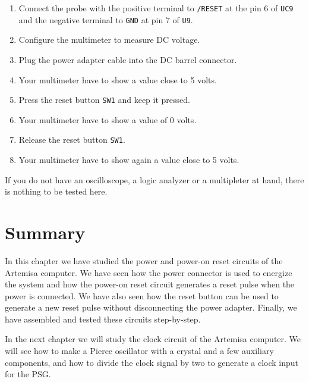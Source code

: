 \begin{enumerate}
  \item Connect the probe with the positive terminal to {\tt /RESET} at the pin 6 of {\tt UC9} and the negative terminal to {\tt GND} at pin 7 of {\tt U9}.
  \item Configure the multimeter to measure DC voltage.
  \item Plug the power adapter cable into the DC barrel connector.
  \item Your multimeter have to show a value close to 5 volts.
  \item Press the reset button {\tt SW1} and keep it pressed.
  \item Your multimeter have to show a value of 0 volts.
  \item Release the reset button {\tt SW1}.
  \item Your multimeter have to show again a value close to 5 volts.
\end{enumerate}

If you do not have an oscilloscope, a logic analyzer or a multipleter at hand, there is nothing to be tested here.

\section{Summary}

In this chapter we have studied the power and power-on reset circuits of the Artemisa computer. We
have seen how the power connector is used to energize the system and how the power-on reset circuit
generates a reset pulse when the power is connected. We have also seen how the reset button can be
used to generate a new reset pulse without disconnecting the power adapter. Finally, we have
assembled and tested these circuits step-by-step.

In the next chapter we will study the clock circuit of the Artemisa computer. We will see how to
make a Pierce oscillator with a crystal and a few auxiliary components, and how to divide the clock
signal by two to generate a clock input for the PSG. 
